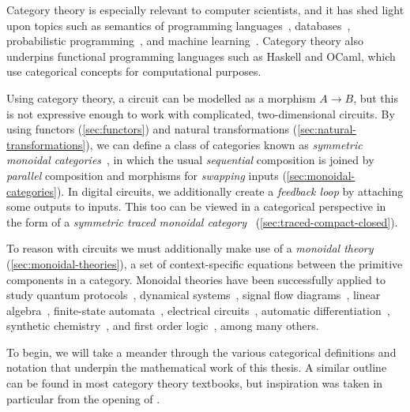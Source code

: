 Category theory is especially relevant to computer scientists, and it has shed
light upon topics such as semantics of programming
languages~\cite{oles1982categorytheoretic}, databases~\cite{spivak2012functorial},
probabilistic programming~\cite{cho2019disintegration,fritz2020synthetic}, and
machine learning~\cite{fong2019backprop,cockett2020reverse}.
Category theory also underpins functional programming languages such as
Haskell and OCaml, which use categorical concepts for computational purposes.

Using category theory, a circuit can be modelled as a morphism \(A \to B\), but
this is not expressive enough to work with complicated, two-dimensional
circuits.
By using functors (\cref{sec:functors}) and natural transformations
(\cref{sec:natural-transformations}), we can define a class of categories known
as \emph{symmetric monoidal categories}~\cite{maclane1963natural}, in which the
usual \emph{sequential} composition is joined by \emph{parallel} composition
and morphisms for \emph{swapping} inputs (\cref{sec:monoidal-categories}).
In digital circuits, we additionally create a
\emph{feedback loop} by attaching some outputs to inputs.
This too can be viewed in a categorical perspective in the form of a
\emph{symmetric traced monoidal category}~\cite{joyal1996traced}
(\cref{sec:traced-compact-closed}).

To reason with circuits we must additionally make use of a
\emph{monoidal theory}
(\cref{sec:monoidal-theories}), a set of context-specific equations between
the primitive components in a category.
Monoidal theories have been successfully applied to study quantum
protocols~\cite{coecke2008interacting}, dynamical
systems~\cite{baez2015categories,fong2016categorical}, signal flow
diagrams~\cite{bonchi2014categorical,bonchi2015full,bonchi2017refinement,bonchi2021survey},
linear algebra~\cite{bonchi2017interacting,zanasi2015interacting,bonchi2019graphical,boisseau2022graphical},
finite-state automata~\cite{piedeleu2021string,piedeleu2022finite}, electrical
circuits~\cite{boisseau2022string}, automatic
differentiation~\cite{alvarez-picallo2023functorial}, synthetic
chemistry~\cite{gale2023categorical}, and first order
logic~\cite{bonchi2024diagrammatic}, among many others.

To begin, we will take a meander through the various categorical definitions and
notation that underpin the mathematical work of this thesis.
A similar outline can be found in most category theory textbooks, but
inspiration was taken in particular from the opening of
\cite{ghica2023string}.








